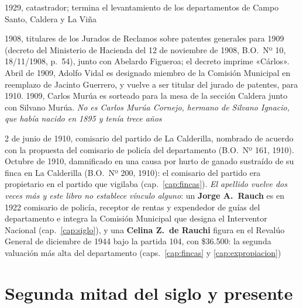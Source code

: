 \begin{personas}
\item[{\textbf{Adeodato Aybar\index{Aybar, Adeodato}}}] 1929, catastrador; termina el levantamiento de los departamentos de Campo Santo, Caldera y La Viña

\item[{\textbf{Adolfo Vidal} y \textbf{Carlos Murúa\index{Murúa, Carlos}}}] 1908, titulares de los Jurados de Reclamos sobre patentes generales para 1909 (decreto del Ministerio de Hacienda del 12 de noviembre de 1908, B.O.\ Nº 10, 18/11/1908, p.\ 54), junto con Abelardo Figueroa; el decreto imprime «Cárlos». Abril de 1909, Adolfo Vidal es designado miembro de la Comisión Municipal en reemplazo de Jacinto Guerrero, y vuelve a ser titular del jurado de patentes, para 1910. 1909, Carlos Murúa es sorteado para la mesa de la sección Caldera junto con Silvano Murúa. \textit{No es Carlos Murúa Cornejo, hermano de Silvano Ignacio, que había nacido en 1895 y tenía trece años}

\item[{\textbf{José Miguel Rauch\index{Rauch, José Miguel}}}] 2 de junio de 1910, comisario del partido de La Calderilla, nombrado de acuerdo con la propuesta del comisario de policía del departamento (B.O.\ Nº 161, 1910). Octubre de 1910, damnificado en una causa por hurto de ganado sustraído de su finca en La Calderilla (B.O.\ Nº 200, 1910): el comisario del partido era propietario en el partido que vigilaba (cap.\ \ref{cap:fincas}). \textit{El apellido vuelve dos veces más y este libro no establece vínculo alguno}: un \textbf{Jorge A.\ Rauch} es en 1922 comisario de policía, receptor de rentas y expendedor de guías del departamento e integra la Comisión Municipal que designa el Interventor Nacional (cap.\ \ref{cap:siglo}), y una \textbf{Celina Z.\ de Rauchi} figura en el Revalúo General de diciembre de 1944 bajo la partida 104, con \$36.500: la segunda valuación más alta del departamento (caps.\ \ref{cap:fincas} y \ref{cap:expropiacion})

\end{personas}

\section*{Segunda mitad del siglo y presente}

